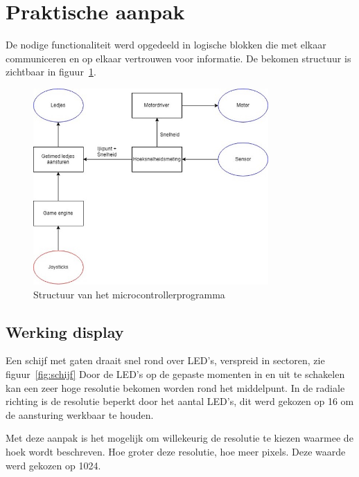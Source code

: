 \documentclass[12pt]{ugentreport}
\begin{document}
\section{Praktische aanpak}
De nodige functionaliteit werd opgedeeld in logische blokken die met elkaar
communiceren en op elkaar vertrouwen voor informatie. De bekomen structuur is
zichtbaar in figuur~\ref{fig:structuur}.

\begin{figure}
  \centering
  \includegraphics[width=0.8\textwidth]{img/structuur.jpg}
  \caption{Structuur van het microcontrollerprogramma}
  \label{fig:structuur}
\end{figure}


\subsection{Werking display}
Een schijf met gaten draait snel rond over LED's, verspreid in sectoren, zie figuur~\ref{fig:schijf}
Door de LED's op de gepaste momenten in en uit te schakelen
kan een zeer hoge resolutie bekomen worden rond het middelpunt.
In de radiale richting is de resolutie beperkt door het aantal LED's,
dit werd gekozen op 16 om de aansturing werkbaar te houden.

Met deze aanpak is het mogelijk om willekeurig de resolutie te kiezen
waarmee de hoek wordt beschreven. Hoe groter deze resolutie,
hoe meer pixels. Deze waarde werd gekozen op 1024.
\end{document}
